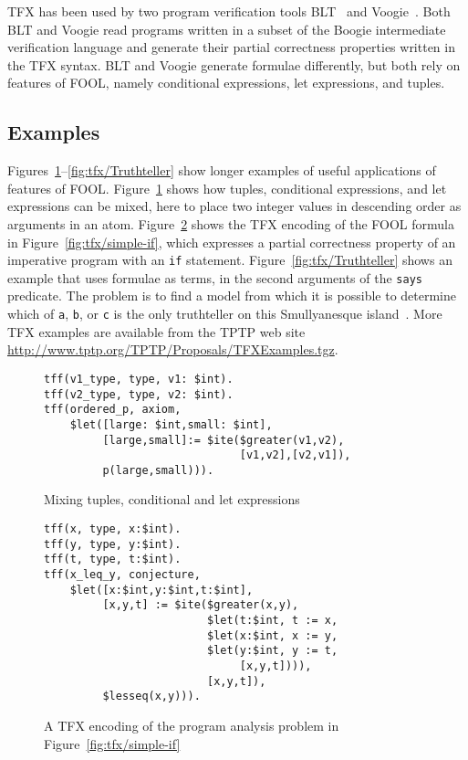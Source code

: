 TFX has been used by two program verification tools BLT~\cite{CF-iFM17} and
Voogie~\cite{KKV18}. 
Both BLT and Voogie read programs written in a subset of the Boogie 
intermediate verification language and generate their partial correctness 
properties written in the TFX syntax. 
BLT and Voogie generate formulae differently, but both rely on features of 
FOOL, namely conditional expressions, let expressions, and tuples.

\subsection{Examples}
\label{sec:tfx/Examples}

Figures~\ref{fig:tfx/TupleConditionalLet}--\ref{fig:tfx/Truthteller} show longer examples of
useful applications of features of FOOL. 
Figure~\ref{fig:tfx/TupleConditionalLet} shows how tuples, conditional expressions, 
and let expressions can be mixed, here to place two integer values in 
descending order as arguments in an atom. 
Figure~\ref{fig:tfx/LetITE} shows the TFX encoding of the FOOL formula in 
Figure~\ref{fig:tfx/simple-if}, which expresses a partial correctness property 
of an imperative program with an \texttt{if} statement. 
Figure~\ref{fig:tfx/Truthteller} shows an example that uses formulae as terms, in 
the second arguments of the \lstinline'says' predicate. 
The problem is to find a model from which it is possible to determine which 
of \lstinline'a', \lstinline'b', or \lstinline'c' is the only truthteller on this Smullyanesque 
island~\cite{Smu78}. 
More TFX examples are available from the TPTP web site 
\url{http://www.tptp.org/TPTP/Proposals/TFXExamples.tgz}.

\begin{figure}
\begin{lstlisting}[language=tptp]
tff(v1_type, type, v1: $int).
tff(v2_type, type, v2: $int).
tff(ordered_p, axiom,
    $let([large: $int,small: $int],
         [large,small]:= $ite($greater(v1,v2),
                              [v1,v2],[v2,v1]),
         p(large,small))).
\end{lstlisting}
\caption{Mixing tuples, conditional and let expressions}
\label{fig:tfx/TupleConditionalLet}
\end{figure}

\begin{figure}
\begin{lstlisting}[language=tptp]
tff(x, type, x:$int).
tff(y, type, y:$int).
tff(t, type, t:$int).
tff(x_leq_y, conjecture,
    $let([x:$int,y:$int,t:$int],
         [x,y,t] := $ite($greater(x,y),
                         $let(t:$int, t := x,
                         $let(x:$int, x := y,
                         $let(y:$int, y := t,
                              [x,y,t]))),
                         [x,y,t]),
         $lesseq(x,y))).
\end{lstlisting}
\caption{A TFX encoding of the program analysis problem in
Figure~\ref{fig:tfx/simple-if}}
\label{fig:tfx/LetITE}
\end{figure}


